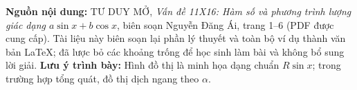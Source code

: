 \documentclass[11pt,a4paper]{article}
\begin{document}
\vspace{3mm}
\begin{tcolorbox}[colback=white,colframe=black!35,boxrule=.4pt,arc=0mm,
 left=2mm,right=2mm,top=1mm,bottom=1mm]
\footnotesize
\textbf{Nguồn nội dung:} TƯ DUY MỞ, \emph{Vấn đề 11X16: Hàm số và phương trình
lượng giác dạng $a\sin x+b\cos x$}, biên soạn Nguyễn Đăng Ái,
trang 1--6 (PDF được cung cấp).
Tài liệu này biên soạn lại phần lý thuyết và toàn bộ ví dụ thành văn bản LaTeX;
đã lược bỏ các khoảng trống để học sinh làm bài và không bổ sung lời giải.
\textbf{Lưu ý trình bày:} Hình đồ thị là minh họa dạng chuẩn $R\sin x$;
trong trường hợp tổng quát, đồ thị dịch ngang theo $\alpha$.
\end{tcolorbox}
\end{document}
